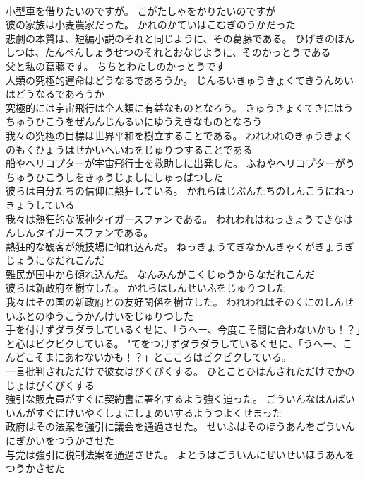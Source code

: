 \documentclass[8pt]{extreport}
\begin{document}
\begin{CJK}{UTF8}{min}
\\	小型車を借りたいのですが。	こがたしゃをかりたいのですが 
\\	彼の家族は小麦農家だった。	かれのかていはこむぎのうかだった 
\\	悲劇の本質は、短編小説のそれと同じように、その葛藤である。	ひげきのほんしつは、たんぺんしょうせつのそれとおなじように、そのかっとうである 
\\	父と私の葛藤です。	ちちとわたしのかっとうです 
\\	人類の究極的運命はどうなるであろうか。	じんるいきゅうきょくてきうんめいはどうなるであろうか 
\\	究極的には宇宙飛行は全人類に有益なものとなろう。	きゅうきょくてきにはうちゅうひこうをぜんんじんるいにゆうえきなものとなろう 
\\	我々の究極の目標は世界平和を樹立することである。	われわれのきゅうきょくのもくひょうはせかいへいわをじゅりつすることである 
\\	船やヘリコプターが宇宙飛行士を救助しに出発した。	ふねやヘリコプターがうちゅうひこうしをきゅうじょしにしゅっぱつした 
\\	彼らは自分たちの信仰に熱狂している。	かれらはじぶんたちのしんこうにねっきょうしている 
\\	我々は熱狂的な阪神タイガースファンである。	われわれはねっきょうてきなはんしんタイガースファンである。 
\\	熱狂的な観客が競技場に傾れ込んだ。	ねっきょうてきなかんきゃくがきょうぎじょうになだれこんだ 
\\	難民が国中から傾れ込んだ。	なんみんがこくじゅうからなだれこんだ 
\\	彼らは新政府を樹立した。	かれらはしんせいふをじゅりつした 
\\	我々はその国の新政府との友好関係を樹立した。	われわれはそのくにのしんせいふとのゆうこうかんけいをじゅりつした 
\\	手を付けずダラダラしているくせに、「うへー、今度こそ間に合わないかも！？」と心はビクビクしている。	"てをつけずダラダラしているくせに、「うへー、こんどこそまにあわないかも！？」とこころはビクビクしている。 
\\	一言批判されただけで彼女はびくびくする。	ひとことひはんされただけでかのじょはびくびくする 
\\	強引な販売員がすぐに契約書に署名するよう強く迫った。	ごういんなはんばいいんがすぐにけいやくしょにしょめいするようつよくせまった 
\\	政府はその法案を強引に議会を通過させた。	せいふはそのほうあんをごういんにぎかいをつうかさせた 
\\	与党は強引に税制法案を通過させた。	よとうはごういんにぜいせいほうあんをつうかさせた 

\end{CJK}
\end{document}
